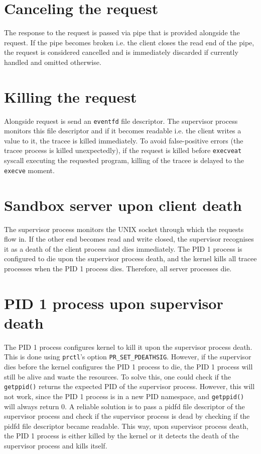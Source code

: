 \documentclass[en]{pracamgr}
\begin{document}
\section{Canceling the request}

The response to the request is passed via pipe that is provided alongside the request. If the pipe becomes broken i.e. the client closes the read end of the pipe, the request is considered cancelled and is immediately discarded if currently handled and omitted otherwise.

\section{Killing the request}

Alongside request is send an \texttt{eventfd} file descriptor. The supervisor process monitors this file descriptor and if it becomes readable i.e. the client writes a value to it, the tracee is killed immediately. To avoid false-positive errors (the tracee process is killed unexpectedly), if the request is killed before \texttt{execveat} syscall executing the requested program, killing of the tracee is delayed to the \texttt{execve} moment.

\section{Sandbox server upon client death}

The supervisor process monitors the UNIX socket through which the requests flow in. If the other end becomes read and write closed, the supervisor recognises it as a death of the client process and dies immediately. The PID 1 process is configured to die upon the supervisor process death, and the kernel kills all tracee processes when the PID 1 process dies. Therefore, all server processes die.

\section{PID 1 process upon supervisor death}

The PID 1 process configures kernel to kill it upon the supervisor process death. This is done using \texttt{prctl}'s option \texttt{PR\_SET\_PDEATHSIG}. However, if the supervisor dies before the kernel configures the PID 1 process to die, the PID 1 process will still be alive and waste the resources. To solve this, one could check if the \texttt{getppid()} returns the expected PID of the supervisor process. However, this will not work, since the PID 1 process is in a new PID namespace, and \texttt{getppid()} will always return 0. A reliable solution is to pass a pidfd file descriptor of the supervisor process and check if the supervisor process is dead by checking if the pidfd file descriptor became readable. This way, upon supervisor process death, the PID 1 process is either killed by the kernel or it detects the death of the supervisor process and kills itself.
\end{document}
